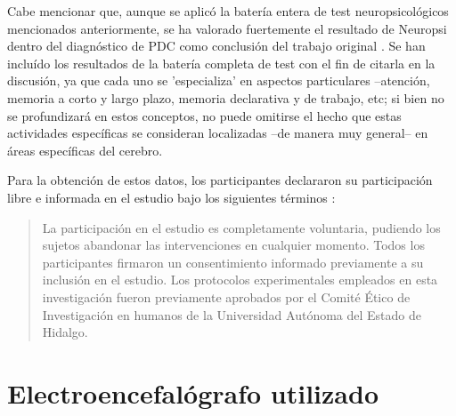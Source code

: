 Cabe mencionar que, aunque se aplic\'o la bater\'ia entera de test neuropsicol\'ogicos mencionados
anteriormente, se ha valorado fuertemente el resultado de Neuropsi dentro del diagn\'ostico de PDC
como conclusi\'on del trabajo original \cite{VazquezTagle16}.
Se han inclu\'ido los resultados de la bater\'ia completa de test con el fin de citarla en la
discusi\'on, ya que cada uno se 'especializa' en aspectos particulares --atenci\'on, memoria a corto
y largo plazo, memoria declarativa y de trabajo, etc; si bien no se profundizar\'a en estos
conceptos, no puede omitirse el hecho que estas actividades espec\'ificas se consideran
localizadas --de manera muy general-- en \'areas espec\'ificas del cerebro.

Para la obtenci\'on de estos datos,
los participantes declararon su participaci\'on libre e informada en el estudio
bajo los siguientes t\'erminos \cite{VazquezTagle16}:
\begin{quote}
La participaci\'on en el estudio es completamente 
voluntaria, pudiendo los sujetos abandonar las intervenciones en cualquier momento. Todos los 
participantes firmaron un consentimiento informado previamente a su inclusi\'on en el estudio. 
Los protocolos experimentales empleados en esta investigaci\'on fueron previamente aprobados por 
el Comit\'e \'Etico de Investigaci\'on en humanos de la Universidad Autónoma del Estado de Hidalgo.
\end{quote}


\section{Electroencefal\'ografo utilizado}

